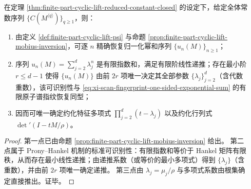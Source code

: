 \begin{theorem}\label{thm:finite-part-cyclic-lift-spectrum-identifiability}
在定理 \ref{thm:finite-part-cyclic-lift-reduced-constant-closed} 的设定下，给定全体常数序列 \(\{C(M^{\langle q\rangle})\}_{q\ge 1}\)，则：
\begin{enumerate}
  \item 由定义 \ref{def:finite-part-cyclic-lift-psi} 与命题 \ref{prop:finite-part-cyclic-lift-mobius-inversion}，可逐 \(n\) 精确恢复归一化幂和序列 \(\{u_n(M)\}_{n\ge 1}\)；
  \item 序列 \(u_n(M)=\sum_{j=2}^{d}\lambda_j^n\) 是有限指数和，满足有限阶线性递推；存在最小阶 \(r\le d-1\) 使得 \(\{u_n(M)\}\) 由前 \(2r\) 项唯一决定其全部参数 \(\{\lambda_j\}_{j=2}^{d}\)（含代数重数），该可识别性与 \eqref{eq:xi-scan-fingerprint-one-sided-exponential-sum} 的有限原子谱指纹恢复同型；
  \item 因而可唯一确定约化特征多项式 \(\prod_{j=2}^{d}(t-\lambda_j)\) 以及约化行列式 \(\det\nolimits'(I-tM/\rho)\)。
\end{enumerate}
\end{theorem}
\begin{proof}
第一点已由命题 \ref{prop:finite-part-cyclic-lift-mobius-inversion} 给出。
第二点属于 Prony--Hankel 机制的标准可识别性：有限指数和等价于 Hankel 矩阵有限秩，从而存在最小线性递推；由递推系数（或等价的最小多项式）得到 \(\{\lambda_j\}\)（含重数），并由前 \(2r\) 项唯一确定递推。
第三点由 \(\lambda_j=\mu_j/\rho\) 与多项式系数由根集确定直接推出。证毕。
\end{proof}

